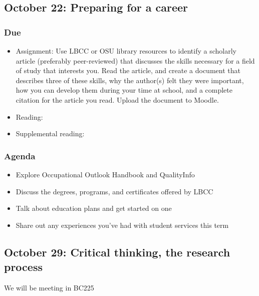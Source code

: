 \documentclass[12pt,article,oneside]{memoir}
\begin{document}
\subsection{October 22: Preparing for a career}
\subsubsection{Due}
\begin{itemize}
 \item Assignment: Use LBCC or OSU library resources to identify a scholarly article (preferably peer-reviewed) that discusses the skills necessary for a field of study that interests you.  Read the article, and create a document that describes three of these skills, why the author(s) felt they were important, how you can develop them during your time at school, and a complete citation for the article you read.  Upload the document to Moodle.
 \item Reading: \cite{worksheets}
 \item Supplemental reading: \cite{crosswalk,ooh}
\end{itemize}

\subsubsection{Agenda}
\begin{itemize}
 \item Explore Occupational Outlook Handbook and QualityInfo
 \item Discuss the degrees, programs, and certificates offered by LBCC
\item Talk about education plans and get started on one
 \item Share out any experiences you've had with student services this term
\end{itemize}


\subsection{October 29: Critical thinking, the research process}
We will be meeting in BC225
\end{document}
